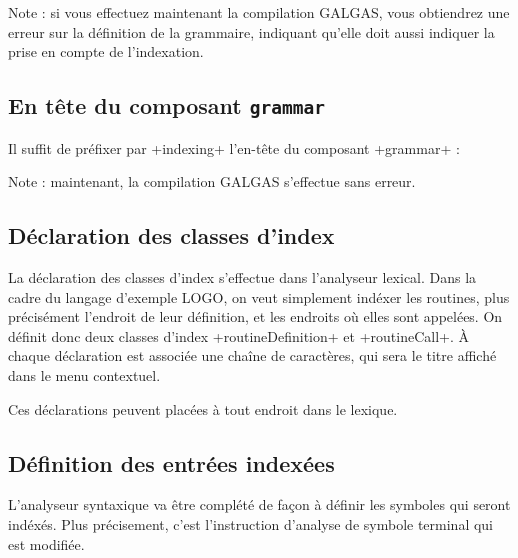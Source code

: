 Note : si vous effectuez maintenant la compilation GALGAS, vous obtiendrez une erreur sur la définition de la grammaire, indiquant qu'elle doit aussi indiquer la prise en compte de l'indexation.




\subsection{En tête du composant \texttt{grammar}}

Il suffit de préfixer par \ggs+indexing+ l'en-tête du composant \ggs+grammar+ :

\begin{galgas}
indexing grammar logo_grammar ... {
  ...
\end{galgas}

Note : maintenant, la compilation GALGAS s'effectue sans erreur.




\subsection{Déclaration des classes d'index}

La déclaration des classes d'index s'effectue dans l'analyseur lexical. Dans la cadre du langage d'exemple LOGO, on veut simplement indéxer les routines, plus précisément l'endroit de leur définition, et les endroits où elles sont appelées. On définit donc deux classes d'index \ggs+routineDefinition+ et \ggs+routineCall+. À chaque déclaration est associée une chaîne de caractères, qui sera le titre affiché dans le menu contextuel. 


\begin{galgas}
lexique logo_lexique indexing in "INDEXING" {
  ...
indexing routineDefinition : "Routine Definition"
  ...
indexing routineCall : "Routine call"
  ...
\end{galgas}


Ces déclarations peuvent placées à tout endroit dans le lexique.



\subsection{Définition des entrées indexées}

L'analyseur syntaxique va être complété de façon à définir les symboles qui seront indéxés. Plus précisement, c'est l'instruction d'analyse de symbole terminal qui est modifiée.

